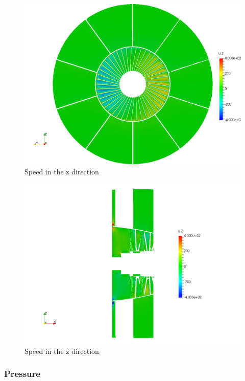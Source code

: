 \begin{figure}[h!]
\centering
\includegraphics[scale=0.28]{./img/screenshoots/Uz1.png}
\caption{Speed in the z direction}
\label{uz1}
\end{figure}

\begin{figure}[h!]
\centering
\includegraphics[scale=0.28]{./img/screenshoots/Uz2.png}
\caption{Speed in the z direction}
\label{uz2}
\end{figure}

\newpage\subsubsection{Pressure}

